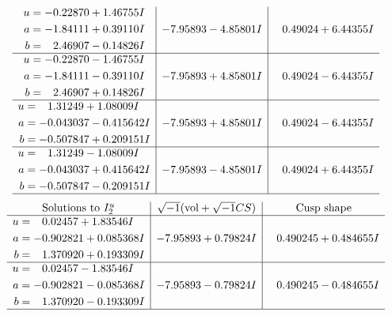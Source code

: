 \documentclass[1p]{elsarticle_modified}
\theoremstyle{definition}
\newcommand{\I}{\sqrt{-1}}
\begin{document}
$$\begin{array}{c|c|c}
\begin{aligned}
u &= -0.22870 + 1.46755 I \\
a &= -1.84111 + 0.39110 I \\
b &= \phantom{-}2.46907 - 0.14826 I\end{aligned}
 & -7.95893 - 4.85801 I & \phantom{-}0.49024 + 6.44355 I \\ \hline\begin{aligned}
u &= -0.22870 - 1.46755 I \\
a &= -1.84111 - 0.39110 I \\
b &= \phantom{-}2.46907 + 0.14826 I\end{aligned}
 & -7.95893 + 4.85801 I & \phantom{-}0.49024 - 6.44355 I \\ \hline\begin{aligned}
u &= \phantom{-}1.31249 + 1.08009 I \\
a &= -0.043037 - 0.415642 I \\
b &= -0.507847 + 0.209151 I\end{aligned}
 & -7.95893 + 4.85801 I & \phantom{-}0.49024 - 6.44355 I \\ \hline\begin{aligned}
u &= \phantom{-}1.31249 - 1.08009 I \\
a &= -0.043037 + 0.415642 I \\
b &= -0.507847 - 0.209151 I\end{aligned}
 & -7.95893 - 4.85801 I & \phantom{-}0.49024 + 6.44355 I\\
 \hline 
 \end{array}$$\newpage$$\begin{array}{c|c|c}  
\text{Solutions to }I^u_{2}& \I (\text{vol} + \sqrt{-1}CS) & \text{Cusp shape}\\
 \hline 
\begin{aligned}
u &= \phantom{-}0.02457 + 1.83546 I \\
a &= -0.902821 + 0.085368 I \\
b &= \phantom{-}1.370920 + 0.193309 I\end{aligned}
 & -7.95893 + 0.79824 I & \phantom{-}0.490245 + 0.484655 I \\ \hline\begin{aligned}
u &= \phantom{-}0.02457 - 1.83546 I \\
a &= -0.902821 - 0.085368 I \\
b &= \phantom{-}1.370920 - 0.193309 I\end{aligned}
 & -7.95893 - 0.79824 I & \phantom{-}0.490245 - 0.484655 I\\
 \hline 
 \end{array}$$\newpage\newpage\renewcommand{\arraystretch}{1}
\end{document}
